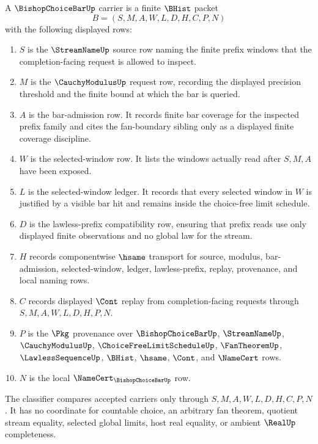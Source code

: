 \begin{definition}
\label{def:bishop-choice-bar-carrier}
A $\BishopChoiceBarUp$ carrier is a finite $\BHist$ packet
$$
B=(S,M,A,W,L,D,H,C,P,N)
$$
with the following displayed rows:
\begin{enumerate}
\item $S$ is the $\StreamNameUp$ source row naming the finite prefix windows that the completion-facing request is allowed to inspect.
\item $M$ is the $\CauchyModulusUp$ request row, recording the displayed precision threshold and the finite bound at which the bar is queried.
\item $A$ is the bar-admission row. It records finite bar coverage for the inspected prefix family and cites the fan-boundary sibling only as a displayed finite coverage discipline.
\item $W$ is the selected-window row. It lists the windows actually read after $S,M,A$ have been exposed.
\item $L$ is the selected-window ledger. It records that every selected window in $W$ is justified by a visible bar hit and remains inside the choice-free limit schedule.
\item $D$ is the lawless-prefix compatibility row, ensuring that prefix reads use only displayed finite observations and no global law for the stream.
\item $H$ records componentwise $\hsame$ transport for source, modulus, bar-admission, selected-window, ledger, lawless-prefix, replay, provenance, and local naming rows.
\item $C$ records displayed $\Cont$ replay from completion-facing requests through $S,M,A,W,L,D,H,P,N$.
\item $P$ is the $\Pkg$ provenance over $\BishopChoiceBarUp$, $\StreamNameUp$, $\CauchyModulusUp$, $\ChoiceFreeLimitScheduleUp$, $\FanTheoremUp$, $\LawlessSequenceUp$, $\BHist$, $\hsame$, $\Cont$, and $\NameCert$ rows.
\item $N$ is the local $\NameCert_{\BishopChoiceBarUp}$ row.
\end{enumerate}
The classifier compares accepted carriers only through $S,M,A,W,L,D,H,C,P,N$. It has no coordinate for countable choice, an arbitrary fan theorem, quotient stream equality, selected global limits, host real equality, or ambient $\RealUp$ completeness.
\end{definition}

